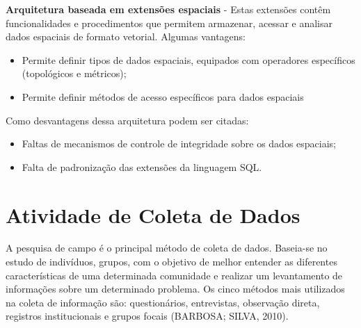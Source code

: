 \documentclass[
	12pt,				%
    oneside,			%
	a4paper,			%
	english,			%
	french,				%
	spanish,			%
	brazil,				%
	]{abntex2}
\begin{document}
\textbf{Arquitetura baseada em extensões espaciais} -  Estas extensões contêm funcionalidades e procedimentos que permitem armazenar, acessar e analisar dados espaciais de formato vetorial. 
Algumas vantagens:
\begin{itemize}
    \item Permite definir tipos de dados espaciais, equipados com operadores específicos (topológicos e métricos);
    \item Permite definir métodos de acesso específicos para dados espaciais
\end{itemize}
	

Como desvantagens dessa arquitetura podem ser citadas:
\begin{itemize}
    \item Faltas de mecanismos de controle de integridade sobre os dados espaciais;
    \item Falta de padronização das extensões da linguagem SQL.
\end{itemize}

\section{Atividade de Coleta de Dados}
A pesquisa de campo é o principal método de coleta de dados. Baseia-se no estudo de indivíduos, grupos, com o objetivo de melhor entender as diferentes características de uma determinada comunidade e realizar um levantamento de informações sobre um determinado problema. Os cinco métodos mais utilizados na coleta de informação são: questionários, entrevistas, observação direta, registros institucionais e grupos focais (BARBOSA; SILVA, 2010).
\end{document}
